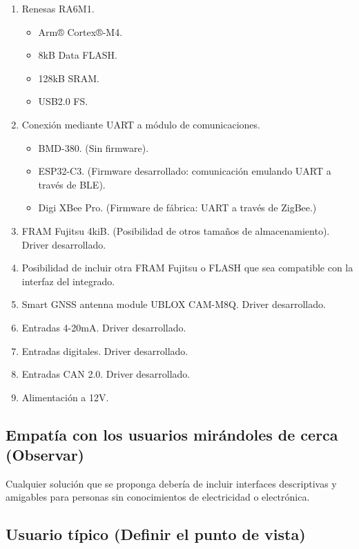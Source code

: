 \begin{enumerate}
   \item Renesas RA6M1.
   \begin{itemize}
      \item Arm® Cortex®-M4.
      \item 8kB Data FLASH.
      \item 128kB SRAM.
      \item USB2.0 FS.
   \end{itemize}
   \item Conexión mediante UART a módulo de comunicaciones.
   \begin{itemize}
      \item BMD-380. (Sin firmware).
      \item ESP32-C3. (Firmware desarrollado: comunicación emulando UART a través de
      BLE).
      \item Digi XBee Pro. (Firmware de fábrica: UART a través de ZigBee.)
   \end{itemize}
   \item FRAM Fujitsu 4kiB. (Posibilidad de otros tamaños de almacenamiento). Driver
   desarrollado.
   \item Posibilidad de incluir otra FRAM Fujitsu o FLASH que sea compatible con la
   interfaz del integrado.
   \item Smart GNSS antenna module UBLOX CAM-M8Q. Driver desarrollado.
   \item Entradas 4-20mA. Driver desarrollado.
   \item Entradas digitales. Driver desarrollado.
   \item Entradas CAN 2.0. Driver desarrollado.
   \item Alimentación a 12V.
\end{enumerate}

\subsection{Empatía con los usuarios mirándoles de cerca (Observar)}

Cualquier solución que se proponga debería de incluir interfaces
descriptivas y amigables para personas sin conocimientos de
electricidad o electrónica.

\subsection{Usuario típico (Definir el punto de vista)}

